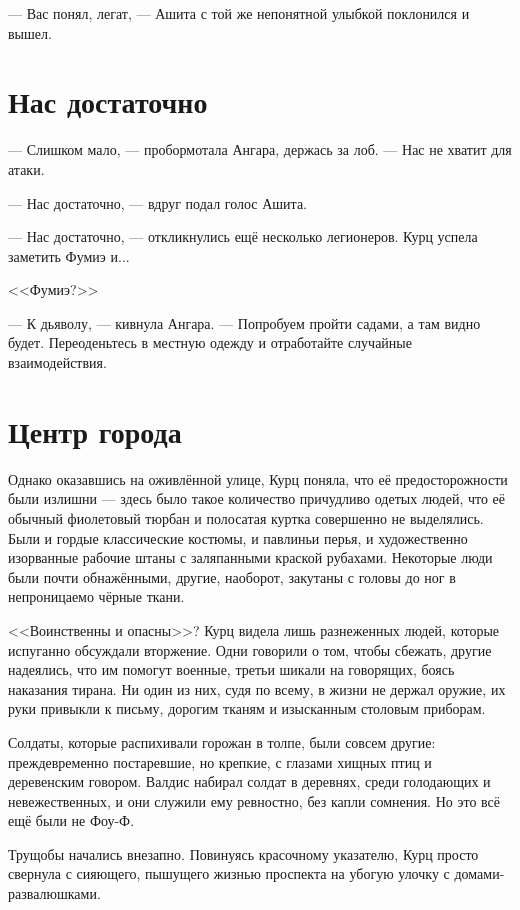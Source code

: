 --- Вас понял, легат, --- Ашита с той же непонятной улыбкой поклонился и вышел.

\section{Нас достаточно}

--- Слишком мало, --- пробормотала Ангара, держась за лоб.
--- Нас не хватит для атаки.

--- Нас достаточно, --- вдруг подал голос Ашита.

--- Нас достаточно, --- откликнулись ещё несколько легионеров.
Курц успела заметить Фумиэ и...

<<Фумиэ?>>

--- К дьяволу, --- кивнула Ангара.
--- Попробуем пройти садами, а там видно будет.
Переоденьтесь в местную одежду и отработайте случайные взаимодействия.

\section{Центр города}

Однако оказавшись на оживлённой улице, Курц поняла, что её предосторожности были излишни --- здесь было такое количество причудливо одетых людей, что её обычный фиолетовый тюрбан и полосатая куртка совершенно не выделялись.
Были и гордые классические костюмы, и павлиньи перья, и художественно изорванные рабочие штаны с заляпанными краской рубахами.
Некоторые люди были почти обнажёнными, другие, наоборот, закутаны с головы до ног в непроницаемо чёрные ткани.

<<Воинственны и опасны>>?
Курц видела лишь разнеженных людей, которые испуганно обсуждали вторжение.
Одни говорили о том, чтобы сбежать, другие надеялись, что им помогут военные, третьи шикали на говорящих, боясь наказания тирана.
Ни один из них, судя по всему, в жизни не держал оружие, их руки привыкли к письму, дорогим тканям и изысканным столовым приборам.

Солдаты, которые распихивали горожан в толпе, были совсем другие: преждевременно постаревшие, но крепкие, с глазами хищных птиц и деревенским говором.
Валдис набирал солдат в деревнях, среди голодающих и невежественных, и они служили ему ревностно, без капли сомнения.
Но это всё ещё были не Фоу-Ф.

\asterism

Трущобы начались внезапно.
Повинуясь красочному указателю, Курц просто свернула с сияющего, пышущего жизнью проспекта на убогую улочку с домами-развалюшками.

